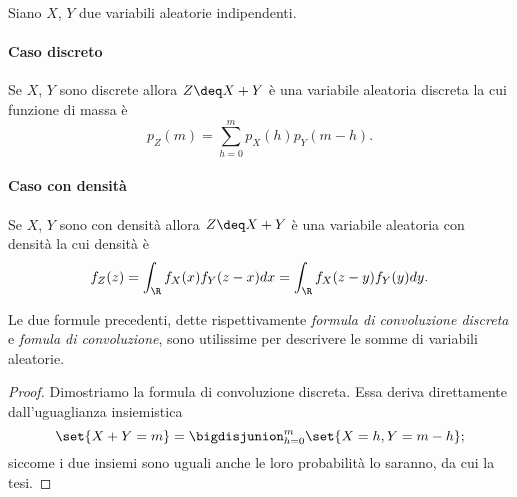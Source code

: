 \begin{proposition}
     Siano $X$, $Y$ due variabili aleatorie indipendenti. 
    \paragraph{Caso discreto} Se $X$, $Y$ sono discrete allora $Z \deq X + Y$ è una variabile aleatoria discreta la cui funzione di massa è \[
        p_Z(m) = \sum_{h = 0}^m p_X(h)p_Y(m-h).    
    \]
    \paragraph{Caso con densità} Se $X$, $Y$ sono con densità allora $Z \deq X + Y$ è una variabile aleatoria con densità la cui densità è \[
        f_Z(z) = \int_\R f_X(x)f_Y(z-x)dx = \int_\R f_X(z-y)f_Y(y)dy.
    \]
\end{proposition}

Le due formule precedenti, dette rispettivamente \emph{formula di convoluzione discreta} e \emph{fomula di convoluzione}, sono utilissime per descrivere le somme di variabili aleatorie.

\begin{proof}
    Dimostriamo la formula di convoluzione discreta. Essa deriva direttamente dall'uguaglianza insiemistica \[
        \set{X+Y = m} = \bigdisjunion_{h = 0}^m \set{X = h, Y = m-h};    
    \] siccome i due insiemi sono uguali anche le loro probabilità lo saranno, da cui la tesi.
\end{proof}